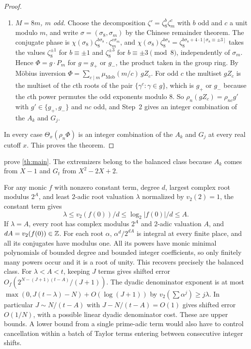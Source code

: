\documentclass[11pt]{article}
\begin{document}
\begin{proof}
\begin{enumerate}[label=(\alph*),leftmargin=*]
\item \emph{$M=8m$, $m$ odd.} Choose the decomposition $\zeta'=\zeta_8^{b}\zeta_m^{c}$ with $b$ odd and $c$ a unit modulo $m$, and write $\sigma=(\sigma_8,\sigma_m)$ by the Chinese remainder theorem. The conjugate phase is $\chi(\sigma_8)\zeta_8^{b\sigma_8}\cdot\zeta_m^{c\sigma_m}$, and $\chi(\sigma_8)\zeta_8^{b\sigma_8}=\zeta_8^{b\sigma_8+4\cdot1[\sigma_8\equiv\pm3]}$ takes the values $\zeta_8^{\pm1}$ for $b\equiv\pm1$ and $\zeta_8^{\pm3}$ for $b\equiv\pm3\pmod 8$, independently of $\sigma_m$. Hence $\Phi=g\cdot P_m$ for $g=g_+$ or $g_-$, the product taken in the group ring. By Möbius inversion $\Phi=\sum_{c\mid m}\mu_{\mathrm{Mob}}(m/c)\,g Z_c$. For odd $c$ the multiset $gZ_c$ is the multiset of the $c$th roots of the pair $\{\gamma^c:\gamma\in g\}$, which is $g_+$ or $g_-$ because the $c$th power permutes the odd exponents modulo $8$. So $\rho_n(gZ_c)=\rho_{nc}g'$ with $g'\in\{g_+,g_-\}$ and $nc$ odd, and Step~2 gives an integer combination of the $A_k$ and $G_j$.
\end{enumerate}
In every case $\Theta_x(\rho_n\Phi)$ is an integer combination of the $A_k$ and $G_j$ at every real cutoff $x$. This proves the theorem.
\end{proof}

\noindent
{} prove \cref{th:main}. The extremizers belong to the balanced class because $A_k$ comes from $X-1$ and $G_t$ from $X^2-2X+2$.

\begin{remark}\label{rem:unbal}
For any monic $f$ with nonzero constant term, degree $d$, largest complex root modulus $2^A$, and least $2$-adic root valuation $\lambda$ normalized by $v_2(2)=1$, the constant term gives
\[
 \lambda\le v_2(f(0))/d\le \log_2|f(0)|/d\le A .
\]
If $\lambda=A$, every root has complex modulus $2^A$ and $2$-adic valuation $A$, and $dA=v_2(f(0))\in\mathbb Z$. For each root $\alpha$, $\alpha^d/2^{dA}$ is integral at every finite place, and all its conjugates have modulus one. All its powers have monic minimal polynomials of bounded degree and bounded integer coefficients, so only finitely many powers occur and it is a root of unity. This recovers precisely the balanced class. For $\lambda<A<t$, keeping $J$ terms gives shifted error $O_f(2^{N-(J+1)(t-A)}/(J+1))$. The dyadic denominator exponent is at most $\max(0,J(t-\lambda)-N)+O(\log(J+1))$ by $v_2(\sum\alpha^j)\ge j\lambda$. In particular $J\sim N/(t-A)$ with $J-N/(t-A)=O(1)$ gives shifted error $O(1/N)$, with a possible linear dyadic denominator cost. These are upper bounds. A lower bound from a single prime-adic term would also have to control cancellation within a batch of Taylor terms entering between consecutive integer shifts.
\end{remark}
\end{document}
